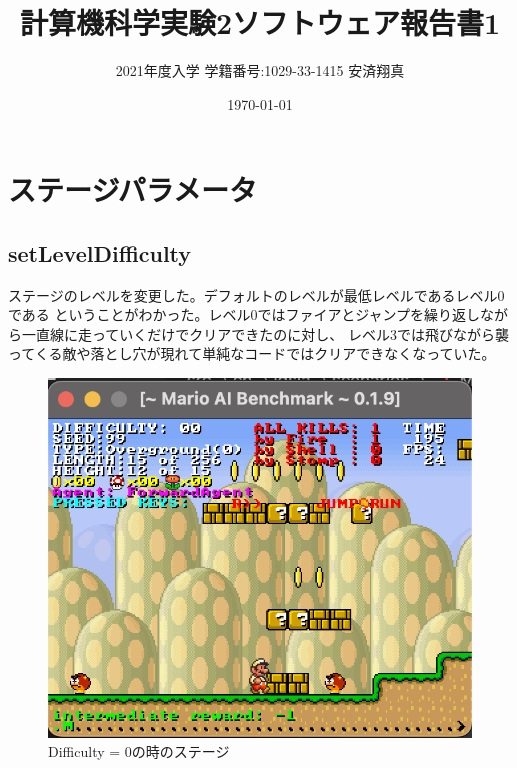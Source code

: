 \documentclass[a4paper,11pt]{jsarticle}
\begin{document}
\title{計算機科学実験2ソフトウェア報告書1}
\author{2021年度入学 学籍番号:1029-33-1415 安済翔真}
\date{\today}
\maketitle

\section*{ステージパラメータ}
\subsection*{setLevelDifficulty}
ステージのレベルを変更した。デフォルトのレベルが最低レベルであるレベル0である
ということがわかった。レベル0ではファイアとジャンプを繰り返しながら一直線に走っていくだけでクリアできたのに対し、
レベル3では飛びながら襲ってくる敵や落とし穴が現れて単純なコードではクリアできなくなっていた。

\begin{figure}[h]
  \centering
  \includegraphics[scale=0.6]
    { images/report1/image-diff0.png }
  \caption[]{Difficulty = 0の時のステージ}
\end{figure}
\end{document}
